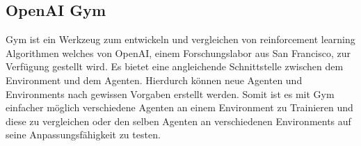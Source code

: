 \subsection{OpenAI Gym}
Gym ist ein Werkzeug zum entwickeln und vergleichen von reinforcement learning Algorithmen welches von OpenAI, einem Forschungslabor aus San Francisco, zur Verfügung gestellt wird. Es bietet eine  \colorbox{red!30}{angleichende  Schnittstelle} zwischen dem Environment und dem Agenten. Hierdurch können neue Agenten und Environments nach gewissen Vorgaben erstellt werden. Somit ist es mit Gym einfacher möglich verschiedene Agenten an einem Environment zu Trainieren und diese zu vergleichen oder den selben Agenten an verschiedenen Environments auf seine Anpassungsfähigkeit zu testen.

